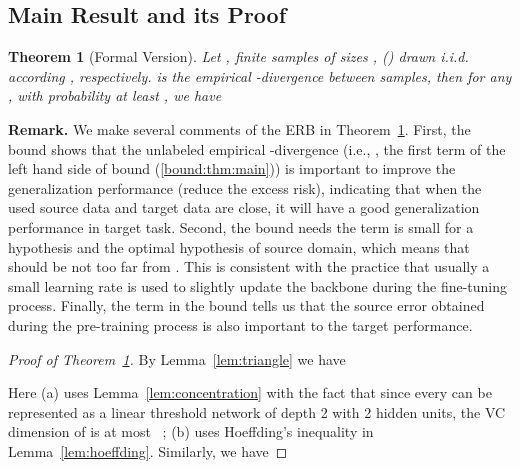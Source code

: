 \documentclass[10pt,twocolumn,letterpaper]{article}
\newtheorem{thm}{Theorem}
\begin{document}
\subsection{Main Result and its Proof}
\begin{thm}[Formal Version]\label{thm:main}
Let ,  finite samples of sizes ,  () drawn i.i.d. according ,  respectively.  is the empirical -divergence between samples, then for any , with probability at least , we have

\end{thm}
{\bf Remark.} We make several comments of the ERB in Theorem~\ref{thm:main}. First, the bound shows that the unlabeled empirical -divergence (i.e., , the first term of the left hand side of bound (\ref{bound:thm:main})) is important to improve the generalization performance (reduce the excess risk), indicating that when the used source data and target data are close, it will have a good generalization performance in target task. Second, the bound needs the term  is small for a hypothesis  and the optimal hypothesis  of source domain, which means that  should be not too far from . This is consistent with the practice that usually a small learning rate is used to slightly update the backbone during the fine-tuning process. Finally, the term  in the bound tells us that the source error obtained during the pre-training process is also important to the target performance. 
\begin{proof}[Proof of Theorem~\ref{thm:main}]
By Lemma~\ref{lem:triangle} we have
    
Here (a) uses Lemma~\ref{lem:concentration} with the fact that since every  can be represented as a linear threshold network of depth 2 with 2 hidden units, the VC dimension of  is at most ~\cite{anthony1999neural,ben2010theory}; (b) uses Hoeffding's inequality in Lemma~\ref{lem:hoeffding}. Similarly, we have

\end{proof}
\end{document}
